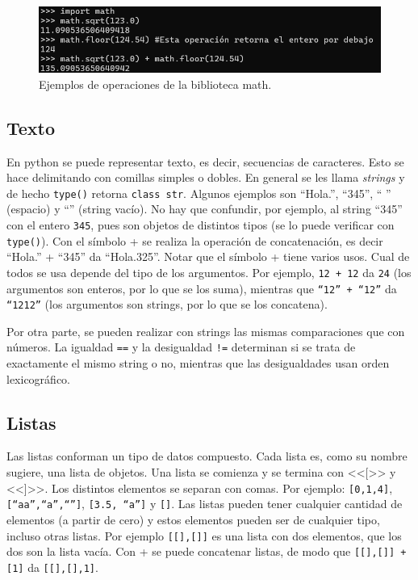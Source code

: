 \documentclass[a4paper, 12pt]{report}
\theoremstyle{definition}
\begin{document}
\begin{figure}
	\centering
	\includegraphics[scale=0.6]{ejemploMath.png}
	\caption{Ejemplos de operaciones de la biblioteca math.}
	\label{fig-ejemploMath}
\end{figure}


\subsection{Texto}

En python se puede representar texto, es decir, secuencias de caracteres. Esto se hace delimitando con comillas simples o dobles. En general se les llama {\sl strings} y de hecho {\tt type()} retorna {\tt class str}. Algunos ejemplos son ``Hola.'', ``345'', `` '' (espacio)  y ``'' (string vacío). No hay que confundir, por ejemplo, al string ``345'' con el entero {\tt 345}, pues son objetos de distintos tipos (se lo puede verificar con {\tt type()}). Con el símbolo + se realiza la operación de concatenación, es decir ``Hola.'' + ``345'' da ``Hola.325''. Notar que el símbolo + tiene varios usos. Cual de todos se usa depende del tipo de los argumentos. Por ejemplo, {\tt 12 + 12} da {\tt 24} (los argumentos son enteros, por lo que se los suma), mientras que {\tt ``12'' + ``12''} da {\tt ``1212''} (los argumentos son strings, por lo que se los concatena).

Por otra parte, se pueden realizar con strings las mismas comparaciones que con números. La igualdad {\tt ==} y la desigualdad {\tt !=} determinan si se trata de exactamente el mismo string o no, mientras que las desigualdades usan orden lexicográfico.

\subsection{Listas}

Las listas conforman un tipo de datos compuesto. Cada lista es, como su nombre sugiere, una lista de objetos. Una lista se comienza y se termina con <<[>> y <<]>>. Los distintos elementos se separan con comas. Por ejemplo: {\tt[0,1,4]}, {\tt[``aa'',``a'',``'']}, {\tt [3.5, ``a'']} y {\tt[]}. Las listas pueden tener cualquier cantidad de elementos (a partir de cero) y estos elementos pueden ser de cualquier tipo, incluso otras listas. Por ejemplo {\tt [[],[]]} es una lista con dos elementos, que los dos son la lista vacía. Con + se puede concatenar listas, de modo que {\tt [[],[]] + [1]} da {\tt [[],[],1]}.
\end{document}
